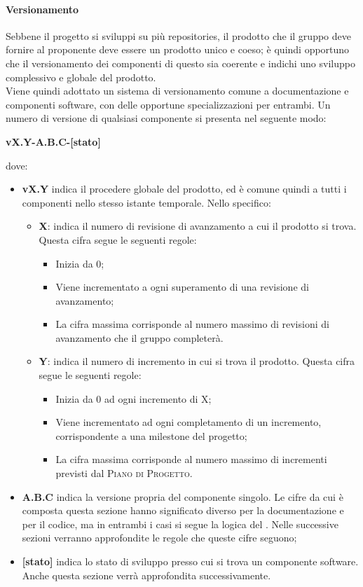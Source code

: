 \documentclass[../norme-di-progetto.tex]{subfiles}
\begin{document}
\paragraph{Versionamento}
Sebbene il progetto si sviluppi su più repositories, il prodotto che il gruppo deve fornire al proponente deve essere un prodotto unico e coeso; è quindi opportuno che il versionamento dei componenti di questo sia coerente e indichi uno sviluppo complessivo e globale del prodotto. \\
Viene quindi adottato un sistema di versionamento comune a documentazione e componenti software, con delle opportune specializzazioni per entrambi. Un numero di versione di qualsiasi componente si presenta nel seguente modo:
\begin{center}
  \centering
  \textbf{vX.Y-A.B.C-[stato]}
\end{center} dove:
\begin{itemize}
  \item \textbf{vX.Y} indica il procedere globale del prodotto, ed è comune quindi a tutti i componenti nello stesso istante temporale. Nello specifico:
  \begin{itemize}
    \item \textbf{X}: indica il numero di revisione di avanzamento a cui il prodotto si trova. Questa cifra segue le seguenti regole:
    \begin{itemize}
      \item Inizia da 0;
      \item Viene incrementato a ogni superamento di una revisione di avanzamento;
      \item La cifra massima corrisponde al numero massimo di revisioni di avanzamento che il gruppo completerà.
    \end{itemize}
    \item \textbf{Y}: indica il numero di incremento in cui si trova il prodotto. Questa cifra segue le seguenti regole:
    \begin{itemize}
      \item Inizia da 0 ad ogni incremento di X;
      \item Viene incrementato ad ogni completamento di un incremento, corrispondente a una milestone del progetto;
      \item La cifra massima corrisponde al numero massimo di incrementi previsti dal \textsc{Piano di Progetto}.
    \end{itemize}
  \end{itemize}
  \item \textbf{A.B.C} indica la versione propria del componente singolo. Le cifre da cui è composta questa sezione hanno significato diverso per la documentazione e per il codice, ma in entrambi i casi si segue la logica del . Nelle successive sezioni verranno approfondite le regole che queste cifre seguono;
  \item \textbf{[stato]} indica lo stato di sviluppo presso cui si trova un componente software. Anche questa sezione verrà approfondita successivamente.
\end{itemize}
\end{document}
